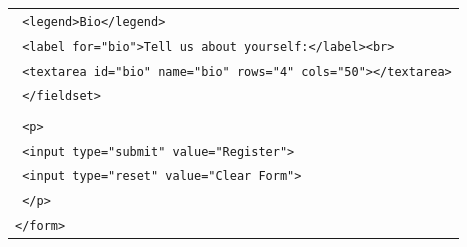 \documentclass[11pt]{article}
\begin{document}
\begin{exoresolu}
\begin{tabular}{@{}l@{}}
\texttt{    \textless legend\textgreater Bio\textless/legend\textgreater} \\
\texttt{    \textless label for="bio"\textgreater Tell us about yourself:\textless/label\textgreater\textless br\textgreater} \\
\texttt{    \textless textarea id="bio" name="bio" rows="4" cols="50"\textgreater\textless/textarea\textgreater} \\
\texttt{  \textless/fieldset\textgreater} \\
\texttt{} \\
\texttt{  \textless p\textgreater} \\
\texttt{    \textless input type="submit" value="Register"\textgreater} \\
\texttt{    \textless input type="reset" value="Clear Form"\textgreater} \\
\texttt{  \textless/p\textgreater} \\
\texttt{\textless/form\textgreater}
\end{tabular}
\end{exoresolu}
\end{document}
